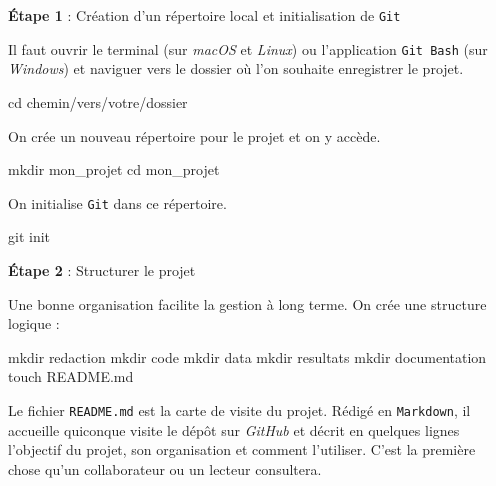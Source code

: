 \documentclass[
  letterpaper,
  DIV=11,
  numbers=noendperiod,
  oneside]{scrreprt}
\newenvironment{Shaded}{\begin{snugshade}}{\end{snugshade}}
\newcommand{\BuiltInTok}[1]{\textcolor[rgb]{0.00,0.23,0.31}{#1}}
\newcommand{\FunctionTok}[1]{\textcolor[rgb]{0.28,0.35,0.67}{#1}}
\newcommand{\NormalTok}[1]{\textcolor[rgb]{0.00,0.23,0.31}{#1}}
\begin{document}
\textbf{Étape 1} : Création d'un répertoire local et initialisation de
\texttt{Git}

Il faut ouvrir le terminal (sur \emph{macOS} et \emph{Linux}) ou
l'application \texttt{Git\ Bash} (sur \emph{Windows}) et naviguer vers
le dossier où l'on souhaite enregistrer le projet.

\begin{Shaded}
\begin{Highlighting}[]
\BuiltInTok{cd}\NormalTok{ chemin/vers/votre/dossier}
\end{Highlighting}
\end{Shaded}

On crée un nouveau répertoire pour le projet et on y accède.

\begin{Shaded}
\begin{Highlighting}[]
\FunctionTok{mkdir}\NormalTok{ mon\_projet}
\BuiltInTok{cd}\NormalTok{ mon\_projet}
\end{Highlighting}
\end{Shaded}

On initialise \texttt{Git} dans ce répertoire.

\begin{Shaded}
\begin{Highlighting}[]
\FunctionTok{git}\NormalTok{ init}
\end{Highlighting}
\end{Shaded}

\textbf{Étape 2} : Structurer le projet

Une bonne organisation facilite la gestion à long terme. On crée une
structure logique :

\begin{Shaded}
\begin{Highlighting}[]
\FunctionTok{mkdir}\NormalTok{ redaction}
\FunctionTok{mkdir}\NormalTok{ code}
\FunctionTok{mkdir}\NormalTok{ data}
\FunctionTok{mkdir}\NormalTok{ resultats}
\FunctionTok{mkdir}\NormalTok{ documentation}
\FunctionTok{touch}\NormalTok{ README.md}
\end{Highlighting}
\end{Shaded}

Le fichier \texttt{README.md} est la carte de visite du projet. Rédigé
en \texttt{Markdown}, il accueille quiconque visite le dépôt sur
\emph{GitHub} et décrit en quelques lignes l'objectif du projet, son
organisation et comment l'utiliser. C'est la première chose qu'un
collaborateur ou un lecteur consultera.
\end{document}
